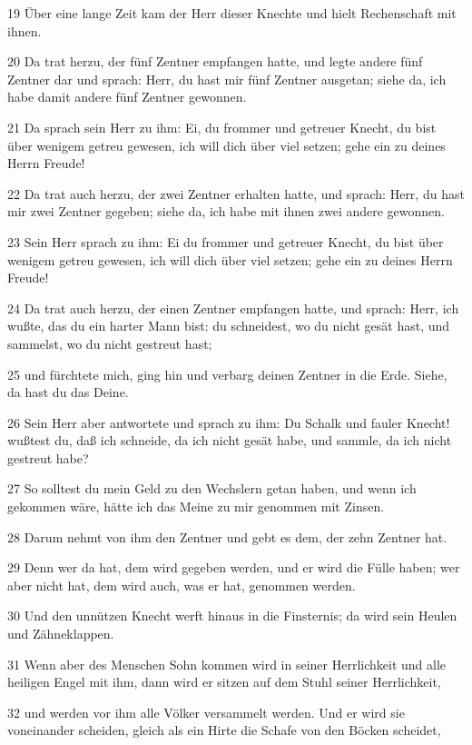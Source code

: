 \par 19 Über eine lange Zeit kam der Herr dieser Knechte und hielt Rechenschaft mit ihnen.
\par 20 Da trat herzu, der fünf Zentner empfangen hatte, und legte andere fünf Zentner dar und sprach: Herr, du hast mir fünf Zentner ausgetan; siehe da, ich habe damit andere fünf Zentner gewonnen.
\par 21 Da sprach sein Herr zu ihm: Ei, du frommer und getreuer Knecht, du bist über wenigem getreu gewesen, ich will dich über viel setzen; gehe ein zu deines Herrn Freude!
\par 22 Da trat auch herzu, der zwei Zentner erhalten hatte, und sprach: Herr, du hast mir zwei Zentner gegeben; siehe da, ich habe mit ihnen zwei andere gewonnen.
\par 23 Sein Herr sprach zu ihm: Ei du frommer und getreuer Knecht, du bist über wenigem getreu gewesen, ich will dich über viel setzen; gehe ein zu deines Herrn Freude!
\par 24 Da trat auch herzu, der einen Zentner empfangen hatte, und sprach: Herr, ich wußte, das du ein harter Mann bist: du schneidest, wo du nicht gesät hast, und sammelst, wo du nicht gestreut hast;
\par 25 und fürchtete mich, ging hin und verbarg deinen Zentner in die Erde. Siehe, da hast du das Deine.
\par 26 Sein Herr aber antwortete und sprach zu ihm: Du Schalk und fauler Knecht! wußtest du, daß ich schneide, da ich nicht gesät habe, und sammle, da ich nicht gestreut habe?
\par 27 So solltest du mein Geld zu den Wechslern getan haben, und wenn ich gekommen wäre, hätte ich das Meine zu mir genommen mit Zinsen.
\par 28 Darum nehmt von ihm den Zentner und gebt es dem, der zehn Zentner hat.
\par 29 Denn wer da hat, dem wird gegeben werden, und er wird die Fülle haben; wer aber nicht hat, dem wird auch, was er hat, genommen werden.
\par 30 Und den unnützen Knecht werft hinaus in die Finsternis; da wird sein Heulen und Zähneklappen.
\par 31 Wenn aber des Menschen Sohn kommen wird in seiner Herrlichkeit und alle heiligen Engel mit ihm, dann wird er sitzen auf dem Stuhl seiner Herrlichkeit,
\par 32 und werden vor ihm alle Völker versammelt werden. Und er wird sie voneinander scheiden, gleich als ein Hirte die Schafe von den Böcken scheidet,
